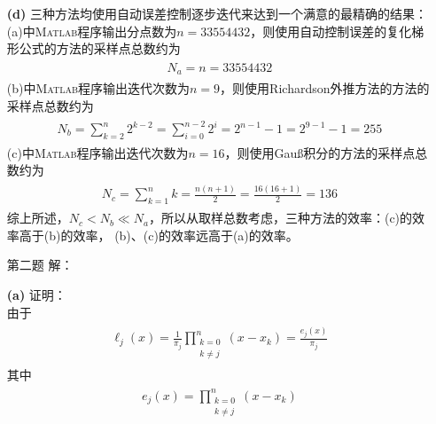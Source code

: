 \documentclass[12pt,a4paper,utf8]{ctexart}
\begin{document}
\begin{enumerate}
   \item[\textbf{(d)}]三种方法均使用自动误差控制逐步迭代来达到一个满意的最精确的结果：\\
         (a)中\textsc{Matlab}程序输出分点数为$n=33554432$，则使用自动控制误差的复化梯形公式的方法的采样点总数约为
         \begin{eqnarray}
            \begin{aligned}
               N_a=n=33554432
               \nonumber
            \end{aligned}
         \end{eqnarray}
         (b)中\textsc{Matlab}程序输出迭代次数为$n=9$，则使用Richardson外推方法的方法的采样点总数约为
         \begin{eqnarray}
            \begin{aligned}
               N_b=\sum_{k=2}^{n} 2^{k-2}=\sum_{i=0}^{n-2} 2^{i}=2^{n-1}-1=2^{9-1}-1=255
               \nonumber
            \end{aligned}
         \end{eqnarray}
         (c)中\textsc{Matlab}程序输出迭代次数为$n=16$，则使用Gauß积分的方法的采样点总数约为
         \begin{eqnarray}
            \begin{aligned}
               N_c=\sum_{k=1}^{n}k=\frac{n(n+1)}{2}=\frac{16(16+1)}{2}=136
               \nonumber
            \end{aligned}
         \end{eqnarray}
         综上所述，$N_c<N_b\ll N_a$，所以从取样总数考虑，三种方法的效率：(c)的效率高于(b)的效率，
         (b)、(c)的效率远高于(a)的效率。
   \item[第二题] 解：
   \item[\textbf{(a)}] 证明：\\
         由于
         \begin{eqnarray}
            \begin{aligned}
               \ell_j(x)=\frac{1}{\pi_j}\prod_{\substack{k=0 \\k \neq j}}^{n}(x-x_k)=\frac{e_j(x)}{\pi_j}
            \end{aligned}
         \end{eqnarray}
         其中
         \begin{eqnarray}
            \begin{aligned}
               e_j(x)=\prod_{\substack{k=0 \\k \neq j}}^{n}(x-x_k)
            \end{aligned}
         \end{eqnarray}

\end{enumerate}
\end{document}
